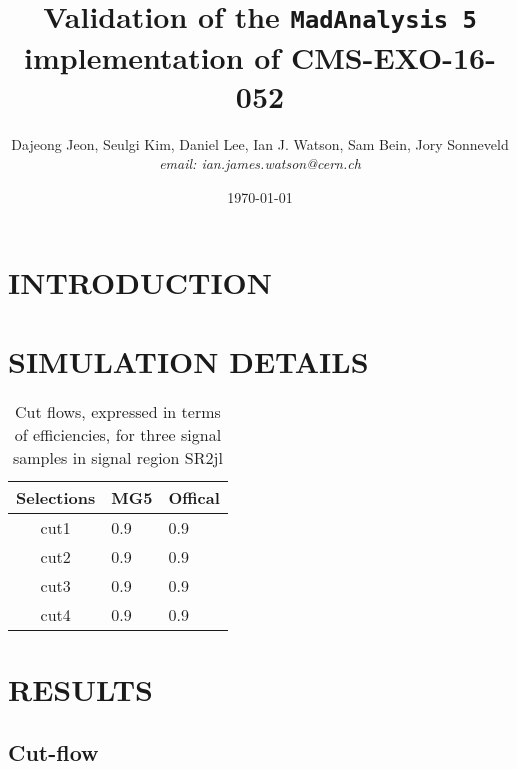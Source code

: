 \documentclass[12pt,A4paper]{article}
\title{Validation of the \texttt{MadAnalysis 5} implementation of CMS-EXO-16-052}
\author{Dajeong Jeon, Seulgi Kim, Daniel Lee, Ian J. Watson, Sam Bein, Jory Sonneveld \\
\normalsize {\it email: ian.james.watson@cern.ch}
\date{\today}
}
\newcommand{\xspace}{~}
\newcommand{\met}{\ensuremath{E_{T}^\mathrm{miss}}\xspace}
\begin{document}
        \maketitle



\section{INTRODUCTION}

\section{SIMULATION DETAILS}
\begin{table}[htb]
\centering
\vspace{5pt}
\begin{tabular}{|c||l|l|}
\hline
Selections & MG5 & Offical \\
\hline
cut1 & 0.9 & 0.9 \\
\hline
cut2 & 0.9 & 0.9 \\
\hline
cut3 & 0.9 & 0.9 \\
\hline
cut4 & 0.9 & 0.9 \\
\hline
\end{tabular}
\caption{Cut flows, expressed in terms of efficiencies, for three signal samples in signal region SR2jl}\label{tab:cutflow}

\end{table}
\section{RESULTS}
\subsection{Cut-flow}
\end{document}
